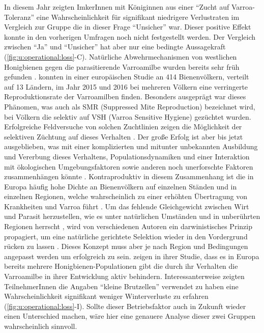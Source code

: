 In diesem Jahr zeigten ImkerInnen mit Königinnen aus einer \enquote{Zucht auf Varroa-Toleranz} eine Wahrscheinlichkeit für signifikant niedrigere Verlustraten im Vergleich zur Gruppe die in dieser Frage \enquote{Unsicher} war. Dieser positive Effekt konnte in den vorherigen Umfragen noch nicht festgestellt werden. Der Vergleich zwischen \enquote{Ja} und \enquote{Unsicher} hat aber nur eine bedingte Aussagekraft (\cref{fig:u:operational:loss}-C).
\newline
Natürliche Abwehrmechanismen von westlichen Honigbienen gegen die parasitierende Varroamilbe wurden bereits sehr früh gefunden \citep{ruttner1984}. \cite{mondet2020} konnten in einer europäischen Studie an 414 Bienenvölkern, verteilt auf 13 Ländern, im Jahr 2015 und 2016 bei mehreren Völkern eine verringerte Reproduktionsrate der Varroamilben finden. Besonders ausgeprägt war dieses Phänomen, was auch als SMR (Suppressed Mite Reproduction) bezeichnet wird, bei Völkern die selektiv auf VSH (Varroa Sensitive Hygiene) gezüchtet wurden. Erfolgreiche Feldversuche von solchen Zuchtlinien zeigen die Möglichkeit der selektiven Züchtung auf dieses Verhalten \citep{spivak2007, mondet2020}. Der große Erfolg ist aber bis jetzt ausgeblieben, was mit einer komplizierten und mitunter unbekannten Ausbildung und Vererbung dieses Verhaltens, Populationsdynamiken und einer Interaktion mit ökologischen Umgebungsfaktoren sowie anderen noch unerforschte Faktoren zusammenhängen könnte \citep{fanny2020, mondet2020}. Kontraproduktiv in diesem Zusammenhang ist die in Europa häufig hohe Dichte an Bienenvölkern auf einzelnen Ständen und in einzelnen Regionen, welche wahrscheinlich zu einer erhöhten Übertragung von Krankheiten und Varroa führt \citep{fries2001, seeley2015, forfert2016, dynes2019}. Um das fehlende Gleichgewicht zwischen Wirt und Parasit herzustellen, wie es unter natürlichen Umständen und in unberührten Regionen herrscht \citep{seeley2007}, wird von verschiedenen Autoren ein darwinistisches Prinzip propagiert, um eine natürliche gerichtete Selektion wieder in den Vordergrund rücken zu lassen \citep{locke2016, neumann2017, buchler2020}. Dieses Konzept muss aber je nach Region und Bedingungen angepasst werden um erfolgreich zu sein. \cite{mondet2020} zeigen in ihrer Studie, dass es in Europa bereits mehrere Honigbienen-Populationen gibt die durch ihr Verhalten die Varroamilbe in ihrer Entwicklung aktiv behindern.
\newline
Interessanterweise zeigten TeilnehmerInnen die Angaben \enquote{kleine Brutzellen} verwendet zu haben eine Wahrscheinlichkeit signifikant weniger Winterverluste zu erfahren (\cref{fig:u:operational:loss}-I). Sollte dieser Betriebsfaktor auch in Zukunft wieder einen Unterschied machen, wäre hier eine genauere Analyse dieser zwei Gruppen wahrscheinlich sinnvoll.

